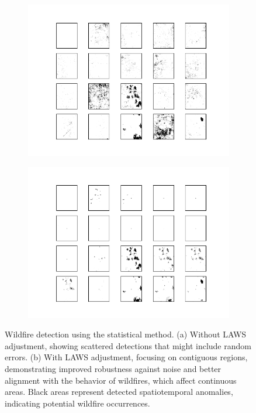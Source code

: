 \documentclass[11pt]{article}
\begin{document}
\begin{figure}[H]
     \centering
     
      \begin{subfigure}[b]{0.45\textwidth}
		\centering
		\includegraphics[width=\textwidth]{../figure/statistical_method_no_laws}
		\caption{}
	 \end{subfigure}
         \hfill
      \begin{subfigure}[b]{0.45\textwidth}
         \includegraphics[width=\textwidth]{../figure/statistical_method_laws}
         \caption{}
     \end{subfigure}
         \caption{Wildfire detection using the statistical method. (a) Without LAWS adjustment, showing scattered detections that might include random errors. (b) With LAWS adjustment, focusing on contiguous regions, demonstrating improved robustness against noise and better alignment with the behavior of wildfires, which affect continuous areas. Black areas represent detected spatiotemporal anomalies, indicating potential wildfire occurrences.}
      \label{fig: statistical_method_real_data}
\end{figure}
\end{document}
